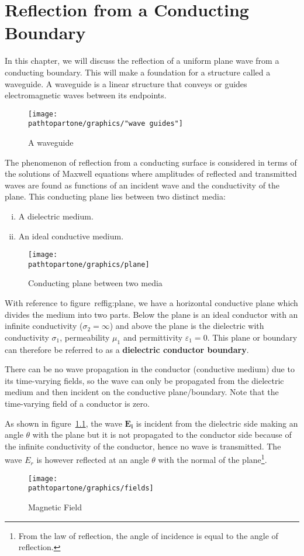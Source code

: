 \chapter{Reflection from a Conducting Boundary}\label{lec:lec34}
In this chapter, we will discuss the reflection of a uniform plane wave from a conducting boundary. This will make a foundation for a structure called a waveguide. A waveguide is a linear structure that conveys or guides electromagnetic waves between its endpoints.
\begin{figure}[h]
\centering
\texttt{[image: \\pathtopartone/graphics/"wave guides"]}
\caption{A waveguide}
\end{figure}

The phenomenon of reflection from a conducting surface is considered in terms of the solutions of Maxwell equations where amplitudes of reflected and transmitted waves are found as functions of an incident wave and the conductivity of the plane. This conducting plane lies between two distinct media: 
\begin{enumerate}[(i)]
\item A dielectric medium.
\item An ideal conductive medium.
\end{enumerate}
\begin{figure}[h]
\centering
\texttt{[image: \\pathtopartone/graphics/plane]}
\caption{Conducting plane between two media}
\label{fig:plane}
\end{figure}

With reference to figure~ref{fig:plane}, we have a horizontal conductive plane which divides the medium into two parts. Below the plane is an ideal conductor with an infinite conductivity ($\sigma _2 =\infty$) and above the plane is the dielectric with conductivity $\sigma_1$, permeability $\mu _1$ and	permittivity $ \varepsilon _1 = 0 $. This plane or boundary can therefore be referred to as a \textbf{dielectric conductor boundary}.
 
There can be no wave propagation in the conductor (conductive medium) due to its time-varying fields, so the wave can only be propagated from the dielectric medium and then incident on the conductive plane/boundary. Note that the time-varying field of a conductor is zero.

As shown in figure~\ref{fig:plane}, the wave $\boldsymbol{E_i}$  is incident from the dielectric side making an angle $ \theta $ with the plane but it is not propagated to the conductor side because of the infinite conductivity of the conductor, hence no wave is transmitted. The wave $E_r$ is however reflected at an angle $ \theta $ with the normal of the plane\footnote{From the law of reflection, the angle of incidence is equal to the angle of reflection.}.
\begin{figure}[h]
\centering
\texttt{[image: \\pathtopartone/graphics/fields]}
\caption{Magnetic Field}
\label{fig:fields}
\end{figure}


